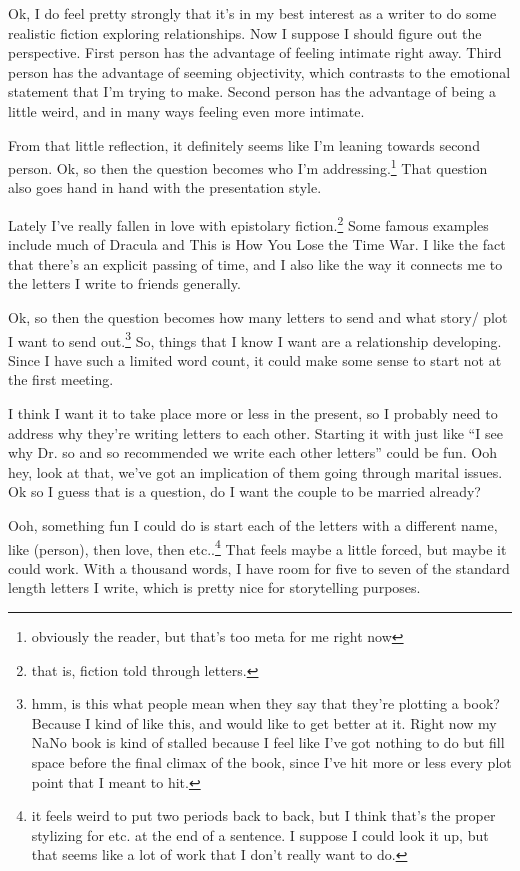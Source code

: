 \documentclass[12pt]{article}[titlepage]
\newcommand{\say}[1]{``#1''}
\newcommand{\1}{\={a}}
\newcommand{\2}{\={e}}
\newcommand{\3}{\={\i}}
\newcommand{\4}{\=o}
\newcommand{\5}{\=u}
\newcommand{\6}{\={A}}
\renewcommand{\,}{\textsuperscript{,}}
\begin{document}
Ok, I do feel pretty strongly that it's in my best interest as a writer to do some realistic fiction exploring relationships.
Now I suppose I should figure out the perspective.
First person has the advantage of feeling intimate right away.
Third person has the advantage of seeming objectivity, which contrasts to the emotional statement that I'm trying to make.
Second person has the advantage of being a little weird, and in many ways feeling even more intimate.

From that little reflection, it definitely seems like I'm leaning towards second person.
Ok, so then the question becomes who I'm addressing.\footnote{obviously the reader, but that's too meta for me right now}
That question also goes hand in hand with the presentation style.

Lately I've really fallen in love with epistolary fiction.\footnote{that is, fiction told through letters.}
Some famous examples include much of Dracula and This is How You Lose the Time War.
I like the fact that there's an explicit passing of time, and I also like the way it connects me to the letters I write to friends generally.

Ok, so then the question becomes how many letters to send and what story/ plot I want to send out.\footnote{hmm, is this what people mean when they say that they're plotting a book?
Because I kind of like this, and would like to get better at it.
Right now my NaNo book is kind of stalled because I feel like I've got nothing to do but fill space before the final climax of the book, since I've hit more or less every plot point that I meant to hit.}
So, things that I know I want are a relationship developing.
Since I have such a limited word count, it could make some sense to start not at the first meeting.

I think I want it to take place more or less in the present, so I probably need to address why they're writing letters to each other.
Starting it with just like \say{I see why Dr. so and so recommended we write each other letters} could be fun.
Ooh hey, look at that, we've got an implication of them going through marital issues.
Ok so I guess that is a question, do I want the couple to be married already?

Ooh, something fun I could do is start each of the letters with a different name, like (person), then love, then etc..\footnote{it feels weird to put two periods back to back, but I think that's the proper stylizing for etc. at the end of a sentence.
I suppose I could look it up, but that seems like a lot of work that I don't really want to do.}
That feels maybe a little forced, but maybe it could work.
With a thousand words, I have room for five to seven of the standard length letters I write, which is pretty nice for storytelling purposes.
\end{document}
